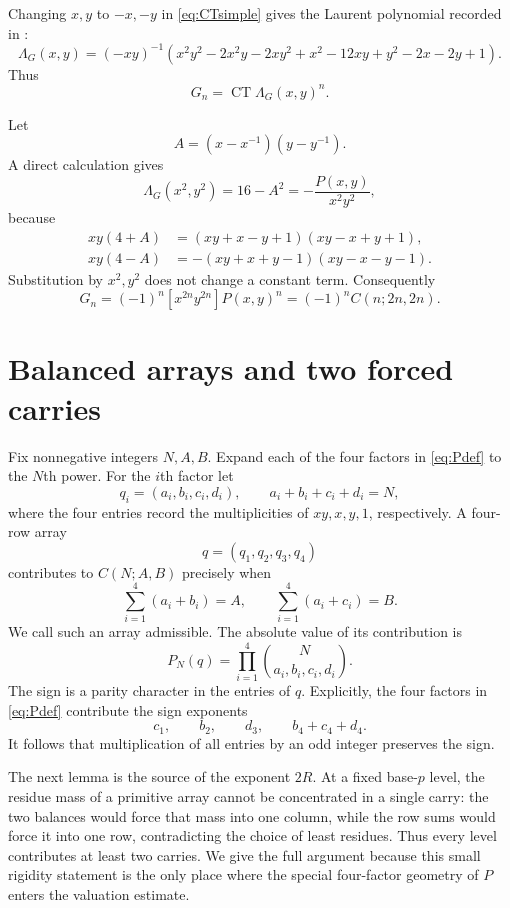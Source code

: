 \documentclass[11pt,reqno]{amsart}
\numberwithin{equation}{section}
\theoremstyle{remark}
\newcommand{\CT}{\operatorname {CT}}
\begin{document}
Changing \(x,y\) to \(-x,-y\) in \eqref{eq:CTsimple} gives the Laurent
polynomial recorded in \cite[(5.2)]{GorodetskyV2}:
\begin{equation}\label{eq:LambdaG}
\Lambda_G(x,y)=(-xy)^{-1}
\left(x^2y^2-2x^2y-2xy^2+x^2-12xy+y^2-2x-2y+1\right).
\end{equation}
Thus
\[
G_n=\CT\Lambda_G(x,y)^n.
\]

Let
\[
A=(x-x^{-1})(y-y^{-1}).
\]
A direct calculation gives
\[
\Lambda_G(x^2,y^2)=16-A^2=-\frac{P(x,y)}{x^2y^2},
\]
because
\[
\begin{split}
xy(4+A)&=(xy+x-y+1)(xy-x+y+1),\\
xy(4-A)&=-(xy+x+y-1)(xy-x-y-1).
\end{split}
\]
Substitution by \(x^2,y^2\) does not change a constant term.  Consequently
\begin{equation}\label{eq:Gcoefficient}
G_n=(-1)^n[x^{2n}y^{2n}]P(x,y)^n
=(-1)^nC(n;2n,2n).
\end{equation}

\section{Balanced arrays and two forced carries}

Fix nonnegative integers \(N,A,B\).  Expand each of the four factors in
\eqref{eq:Pdef} to the \(N\)th power.  For the \(i\)th factor let
\[
q_i=(a_i,b_i,c_i,d_i),\qquad
a_i+b_i+c_i+d_i=N,
\]
where the four entries record the multiplicities of \(xy,x,y,1\),
respectively.  A four-row array
\[
q=(q_1,q_2,q_3,q_4)
\]
contributes to \(C(N;A,B)\) precisely when
\begin{equation}\label{eq:balances}
\sum_{i=1}^4(a_i+b_i)=A,\qquad
\sum_{i=1}^4(a_i+c_i)=B.
\end{equation}
We call such an array admissible.  The absolute value of its contribution is
\begin{equation}\label{eq:PN}
P_N(q)=\prod_{i=1}^4
\binom{N}{a_i,b_i,c_i,d_i}.
\end{equation}
The sign is a parity character in the entries of \(q\).  Explicitly, the
four factors in \eqref{eq:Pdef} contribute the sign exponents
\[
c_1,\qquad b_2,\qquad d_3,\qquad b_4+c_4+d_4.
\]
It follows that multiplication of all entries by an odd integer preserves
the sign.

The next lemma is the source of the exponent \(2R\).  At a fixed base-\(p\)
level, the residue mass of a primitive array cannot be concentrated in a
single carry: the two balances would force that mass into one column, while
the row sums would force it into one row, contradicting the choice of least
residues.  Thus every level contributes at least two carries.  We give the
full argument because this small rigidity statement is the only place where
the special four-factor geometry of \(P\) enters the valuation estimate.
\end{document}
